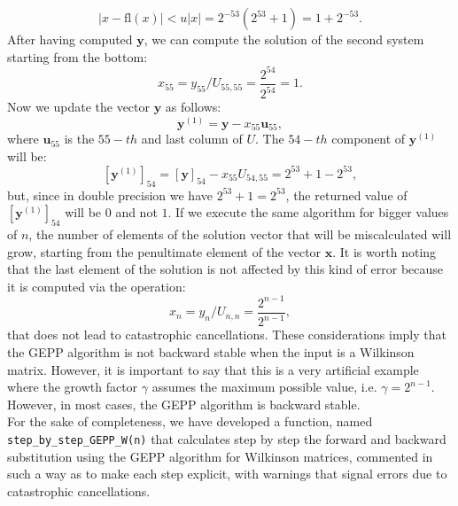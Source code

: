 \documentclass[a4paper,11pt]{article}
\begin{document}
\begin{equation}
	|x - \text{fl}(x)| < u |x| = 2^{-53}(2^{53}+1) = 1 + 2^{-53}.
\end{equation}
After having computed $\textbf{y}$, we can compute the solution of the second system starting from the bottom:
\begin{equation}\label{key}
	x_{55} = y_{55}/U_{55,55} = \frac{2^{54}}{2^{54}} = 1.
\end{equation}
Now we update the vector $\textbf{y}$ as follows:
\begin{equation}\label{key}
	\textbf{y}^{(1)} = \textbf{y} - x_{55} \textbf{u}_{55},
\end{equation}
where $\textbf{u}_{55}$ is the $55-th$ and last column of $U$. The $54-th$ component of $\textbf{y}^{(1)}$ will be:
\begin{equation}\label{key}
	[\textbf{y}^{(1)}]_{54} = [\textbf{y}]_{54} - x_{55} U_{54,55} = 2^{53} + 1 - 2^{53},
\end{equation}
but, since in double precision we have $ 2^{53} + 1 = 2^{53}$, the returned value of  $[\textbf{y}^{(1)}]_{54}$ will be $0$ and not $1$. If we execute the same algorithm for bigger values of $n$, the number of elements of the solution vector that will be miscalculated will grow, starting from the penultimate element of the vector $\textbf{x}$. It is worth noting that the last element of the solution is not affected by this kind of error because it is computed via the operation:
\begin{equation}\label{key}
	x_{n} = y_{n}/U_{n,n} = \frac{2^{n-1}}{2^{n-1}},
\end{equation}
that does not lead to catastrophic cancellations. These considerations imply that the GEPP algorithm is not backward stable when the input is a Wilkinson matrix. However, it is important to say that this is a very artificial example where the growth factor $\gamma$ assumes the maximum possible value, i.e. $\gamma = 2^{n-1}$. However, in most cases, the GEPP algorithm is backward stable.\\

\noindent For the sake of completeness, we have developed a function, named \texttt{step_by_step_GEPP_W(n)} that calculates step by step the forward and backward substitution using the GEPP algorithm for Wilkinson matrices, commented in such a way as to make each step explicit, with warnings that signal errors due to catastrophic cancellations.
\end{document}
